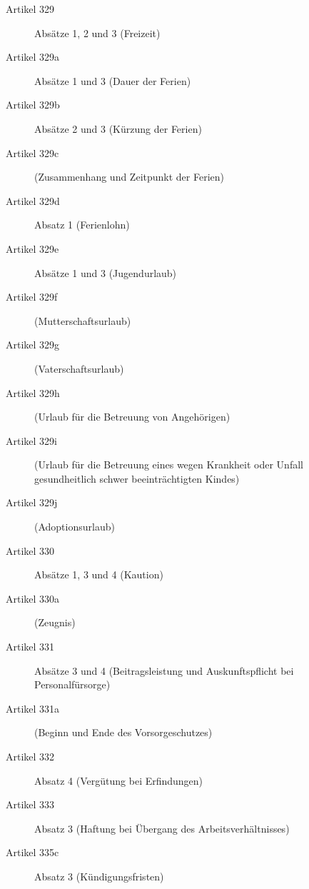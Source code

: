 \begin{description}
    \item[Artikel 329]
    Absätze 1, 2 und 3 (Freizeit)

    \item[Artikel 329a]
    Absätze 1 und 3 (Dauer der Ferien)

    \item[Artikel 329b]
    Absätze 2 und 3 (Kürzung der Ferien)

    \item[Artikel 329c]
    (Zusammenhang und Zeitpunkt der Ferien)

    \item[Artikel 329d]
    Absatz 1 (Ferienlohn)

    \item[Artikel 329e]
    Absätze 1 und 3 (Jugendurlaub)

    \item[Artikel 329f]
    (Mutterschaftsurlaub)

    \item[Artikel 329g]
    (Vaterschaftsurlaub)

    \item[Artikel 329h]
    (Urlaub für die Betreuung von Angehörigen)

    \item[Artikel 329i]
    (Urlaub für die Betreuung eines wegen Krankheit oder Unfall gesundheitlich schwer beeinträchtigten Kindes)

    \item[Artikel 329j]
    (Adoptionsurlaub)

    \item[Artikel 330]
    Absätze 1, 3 und 4 (Kaution)

    \item[Artikel 330a]
    (Zeugnis)

    \item[Artikel 331]
    Absätze 3 und 4 (Beitragsleistung und Auskunftspflicht bei Personalfürsorge)

    \item[Artikel 331a]
    (Beginn und Ende des Vorsorgeschutzes)

    \item[Artikel 332]
    Absatz 4 (Vergütung bei Erfindungen)

    \item[Artikel 333]
    Absatz 3 (Haftung bei Übergang des Arbeitsverhältnisses)

    \item[Artikel 335c]
    Absatz 3 (Kündigungsfristen)


\end{description}
